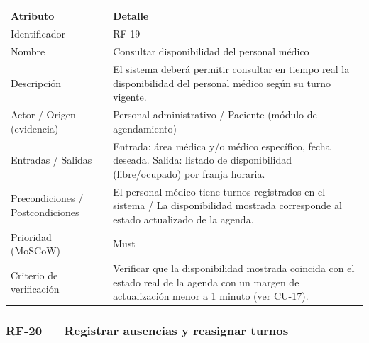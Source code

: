 \documentclass[11pt,a4paper]{article}
\begin{document}
	\begin{longtable}{p{} p{}}
		
		\toprule
		\textbf{Atributo} & \textbf{Detalle} \\
		\midrule
		\endhead
		
		Identificador & RF-19 \\
		Nombre & Consultar disponibilidad del personal médico \\
		Descripción & El sistema deberá permitir consultar en tiempo real la disponibilidad del personal médico según su turno vigente. \\
		Actor / Origen (evidencia) & Personal administrativo / Paciente (módulo de agendamiento) \\
		Entradas / Salidas & Entrada: área médica y/o médico específico, fecha deseada. Salida: listado de disponibilidad (libre/ocupado) por franja horaria. \\
		Precondiciones / Postcondiciones & El personal médico tiene turnos registrados en el sistema / La disponibilidad mostrada corresponde al estado actualizado de la agenda. \\
		Prioridad (MoSCoW) & Must \\
		Criterio de verificación & Verificar que la disponibilidad mostrada coincida con el estado real de la agenda con un margen de actualización menor a 1 minuto (ver CU-17). \\
		\bottomrule
	\end{longtable}
	
	\subsubsection{RF-20 --- Registrar ausencias y reasignar turnos}
	
\end{document}
